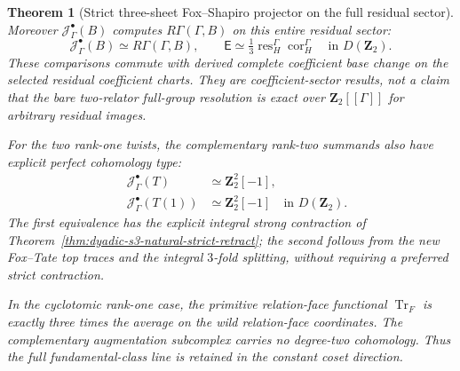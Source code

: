 \documentclass[11pt]{article}
\newtheorem{theorem}{Theorem}[section]
\theoremstyle{definition}
\begin{document}
\begin{theorem}[Strict three-sheet Fox--Shapiro projector on the full residual sector]
Moreover
$\mathcal J_\Gamma^\bullet(B)$
\emph{computes}
$R\Gamma(\Gamma,B)$
on this entire
residual sector:
\begin{equation}\label{eq:dyadic-f134-sectorwise-full-marked-completeness}
\boxed{\quad
\mathcal J_\Gamma^\bullet(B)
\simeq R\Gamma(\Gamma,B),
\qquad
\mathsf E
\simeq\tfrac13
\operatorname{res}_H^\Gamma
\operatorname{cor}_H^\Gamma
\quad\text{in }D(\mathbf Z_2).
\quad}
\end{equation}
These comparisons
commute with
derived complete
coefficient base change
on the selected
residual coefficient
charts.
They are
\emph{coefficient-sector}
results, not a
claim that the
bare two-relator
full-group
resolution is
exact over
$\mathbf Z_2[[\Gamma]]$
for arbitrary
residual images.

For the two
rank-one twists,
the complementary
rank-two summands
also have explicit
perfect cohomology
type:
\begin{equation}\label{eq:dyadic-f134-augmented-tate-ledger}
\boxed{\quad
\begin{aligned}
\mathcal J_\Gamma^\bullet(T)
&\simeq\mathbf Z_2^2[-1],\\
\mathcal J_\Gamma^\bullet(T(1))
&\simeq\mathbf Z_2^2[-1]
\quad\text{in }D(\mathbf Z_2).
\end{aligned}}
\end{equation}
The first equivalence
has the explicit
integral strong
contraction of
Theorem~\ref{thm:dyadic-s3-natural-strict-retract};
the second follows
from the new
Fox--Tate
top traces and
the integral
$3$-fold splitting,
without requiring
a preferred
strict contraction.

In the cyclotomic
rank-one case,
the primitive
relation-face
functional
$\operatorname{Tr}_F$
is exactly
\emph{three times
the average}
on the wild
relation-face
coordinates.
The complementary
augmentation
subcomplex carries
no degree-two
cohomology.
Thus the full
fundamental-class
line is retained
in the
\emph{constant
coset} direction.
\end{theorem}
\end{document}
